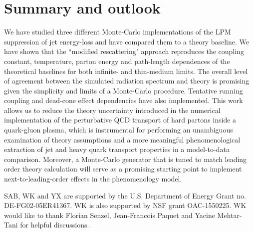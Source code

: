 \documentclass[aps, prc, reprint, amsmath, groupedaddress, nofootinbib]{revtex4-1}
\begin{document}
\section{Summary and outlook}\label{section:summary}
We have studied three different Monte-Carlo implementations of the LPM suppression of jet energy-loss and have compared them to a theory baseline.
We have shown that the ``modified rescattering" approach reproduces the coupling constant, temperature, parton energy and path-length dependences of the theoretical baselines for both infinite- and thin-medium limits.
The overall level of agreement between the simulated radiation spectrum and theory is promising given the simplicity and limits of a Monte-Carlo procedure. Tentative running coupling and dead-cone effect dependencies have also implemented.
This work allows us to reduce the theory uncertainty introduced in the numerical implementation of the perturbative QCD transport of hard partons inside a quark-gluon plasma, which is instrumental for performing an unambiguous examination of theory assumptions and a more meaningful phenomenological extraction of jet and heavy quark transport properties in a model-to-data comparison.
Moreover, a Monte-Carlo generator that is tuned to match leading order theory calculation will serve as a promising starting point to implement next-to-leading-order effects in the phenomenology model.


\begin{acknowledgments}
SAB, WK and YX are supported by the U.S. Department of Energy Grant no. DE-FG02-05ER41367. WK is also supported by NSF grant OAC-1550225.
WK would like to thank Florian Senzel, Jean-Francois Paquet and Yacine Mehtar-Tani for helpful discussions.
\end{acknowledgments}
\end{document}
